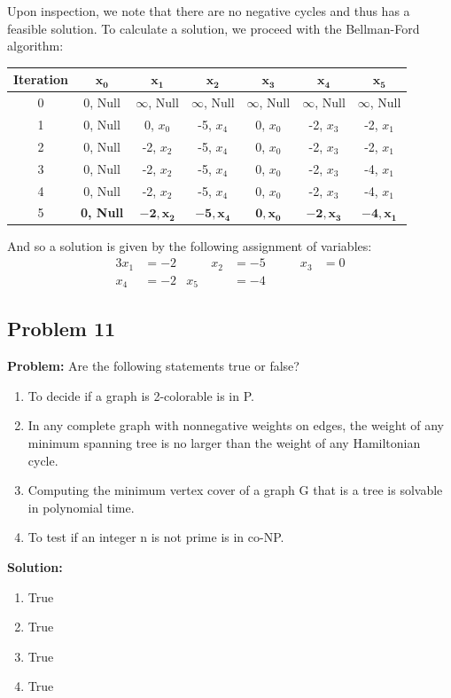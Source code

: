 \documentclass{article}
\begin{document}

Upon inspection, we note that there are no negative cycles and thus has a feasible solution. To calculate a solution, we proceed with the Bellman-Ford algorithm:
\begin{center}
  \begin{tabular}{c|c|c|c|c|c|c}
    \textbf{Iteration} & $\bm{x_0}$ & $\bm{x_1}$ & $\bm{x_2}$ & $\bm{x_3}$ & $\bm{x_4}$ & $\bm{x_5}$\\
    \hline
    0 & 0, Null & $\infty$, Null & $\infty$, Null & $\infty$, Null & $\infty$, Null & $\infty$, Null\\
    \hline
    1 & 0, Null & 0, $x_0$ & -5, $x_4$ & 0, $x_0$ & -2, $x_3$ & -2, $x_1$\\
    \hline
    2 & 0, Null & -2, $x_2$ & -5, $x_4$ & 0, $x_0$ & -2, $x_3$ & -2, $x_1$\\
    \hline
    3 & 0, Null & -2, $x_2$ & -5, $x_4$ & 0, $x_0$ & -2, $x_3$ & -4, $x_1$\\
    \hline
    4 & 0, Null & -2, $x_2$ & -5, $x_4$ & 0, $x_0$ & -2, $x_3$ & -4, $x_1$\\
    \hline
    5 & \textbf{0, Null} & $\bm{-2, x_2}$ & $\bm{-5, x_4}$ & $\bm{0, x_0}$ & $\bm{-2, x_3}$ & $\bm{-4, x_1}$
  \end{tabular}
\end{center}

And so a solution is given by the following assignment of variables:
\begin{alignat*}{3}
  x_1  & = -2  &\qquad  x_2 &  = -5  &\qquad  x_3  & = 0\\
  x_4  & = -2  &  x_5 & = -4
\end{alignat*}

\subsection*{Problem 11}
\noindent\textbf{Problem:} Are the following statements true or false?
\begin{enumerate}[label=\alph*)]
  \item To decide if a graph is 2-colorable is in P.
  \item In any complete graph with nonnegative weights on edges, the weight of any minimum spanning tree is no larger than the weight of any Hamiltonian cycle.  
  \item Computing the minimum vertex cover of a graph G that is a tree is solvable in polynomial time.
  \item To test if an integer n is not prime is in co-NP.
\end{enumerate}
\bigskip

\noindent\textbf{Solution:}
\begin{enumerate}[label=\alph*)]
  \item True
  \item True
  \item True
  \item True
\end{enumerate}
\end{document}
